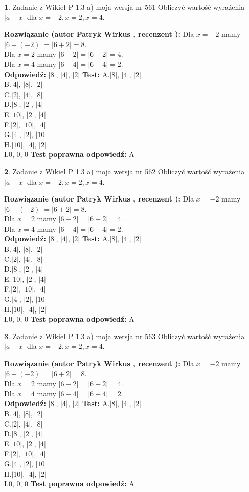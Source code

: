 \documentclass[12pt, a4paper]{article}
\theoremstyle{definition} %
\newtheorem{zad}{}
\newcommand{\zadStart}[1]{\begin{zad}#1\newline}
\newcommand{\zadStop}{\end{zad}}
\newcommand{\rozwStart}[2]{\noindent \textbf{Rozwiązanie (autor #1 , recenzent #2): }\newline}
\newcommand{\rozwStop}{\newline}
\newcommand{\odpStart}{\noindent \textbf{Odpowiedź:}\newline}
\newcommand{\odpStop}{\newline}
\newcommand{\testStart}{\noindent \textbf{Test:}\newline}
\newcommand{\testStop}{\newline}
\newcommand{\kluczStart}{\noindent \textbf{Test poprawna odpowiedź:}\newline}
\newcommand{\kluczStop}{\newline}
\begin{document}
\zadStart{Zadanie z Wikieł P 1.3 a) moja wersja nr 561}
Obliczyć wartość wyrażenia $|a - x|$ dla $x=-2,x=2,x=4$.
\zadStop
\rozwStart{Patryk Wirkus}{}
Dla $x = -2$ mamy $|6 - (-2)| = |6 + 2| = 8$.\\
Dla $x = 2$ mamy $|6 - 2| = |6 - 2| = 4$.\\
Dla $x = 4$ mamy $|6 - 4| = |6 - 4| = 2$.\\
\rozwStop
\odpStart
$|8|$, $|4|$, $|2|$
\odpStop
\testStart
A.$|8|$, $|4|$, $|2|$\\
B.$|4|$, $|8|$, $|2|$\\
C.$|2|$, $|4|$, $|8|$\\
D.$|8|$, $|2|$, $|4|$\\
E.$|10|$, $|2|$, $|4|$\\
F.$|2|$, $|10|$, $|4|$\\
G.$|4|$, $|2|$, $|10|$\\
H.$|10|$, $|4|$, $|2|$\\
I.$0$, $0$, $0$
\testStop
\kluczStart
A
\kluczStop



\zadStart{Zadanie z Wikieł P 1.3 a) moja wersja nr 562}
Obliczyć wartość wyrażenia $|a - x|$ dla $x=-2,x=2,x=4$.
\zadStop
\rozwStart{Patryk Wirkus}{}
Dla $x = -2$ mamy $|6 - (-2)| = |6 + 2| = 8$.\\
Dla $x = 2$ mamy $|6 - 2| = |6 - 2| = 4$.\\
Dla $x = 4$ mamy $|6 - 4| = |6 - 4| = 2$.\\
\rozwStop
\odpStart
$|8|$, $|4|$, $|2|$
\odpStop
\testStart
A.$|8|$, $|4|$, $|2|$\\
B.$|4|$, $|8|$, $|2|$\\
C.$|2|$, $|4|$, $|8|$\\
D.$|8|$, $|2|$, $|4|$\\
E.$|10|$, $|2|$, $|4|$\\
F.$|2|$, $|10|$, $|4|$\\
G.$|4|$, $|2|$, $|10|$\\
H.$|10|$, $|4|$, $|2|$\\
I.$0$, $0$, $0$
\testStop
\kluczStart
A
\kluczStop



\zadStart{Zadanie z Wikieł P 1.3 a) moja wersja nr 563}
Obliczyć wartość wyrażenia $|a - x|$ dla $x=-2,x=2,x=4$.
\zadStop
\rozwStart{Patryk Wirkus}{}
Dla $x = -2$ mamy $|6 - (-2)| = |6 + 2| = 8$.\\
Dla $x = 2$ mamy $|6 - 2| = |6 - 2| = 4$.\\
Dla $x = 4$ mamy $|6 - 4| = |6 - 4| = 2$.\\
\rozwStop
\odpStart
$|8|$, $|4|$, $|2|$
\odpStop
\testStart
A.$|8|$, $|4|$, $|2|$\\
B.$|4|$, $|8|$, $|2|$\\
C.$|2|$, $|4|$, $|8|$\\
D.$|8|$, $|2|$, $|4|$\\
E.$|10|$, $|2|$, $|4|$\\
F.$|2|$, $|10|$, $|4|$\\
G.$|4|$, $|2|$, $|10|$\\
H.$|10|$, $|4|$, $|2|$\\
I.$0$, $0$, $0$
\testStop
\kluczStart
A
\kluczStop
\end{document}
